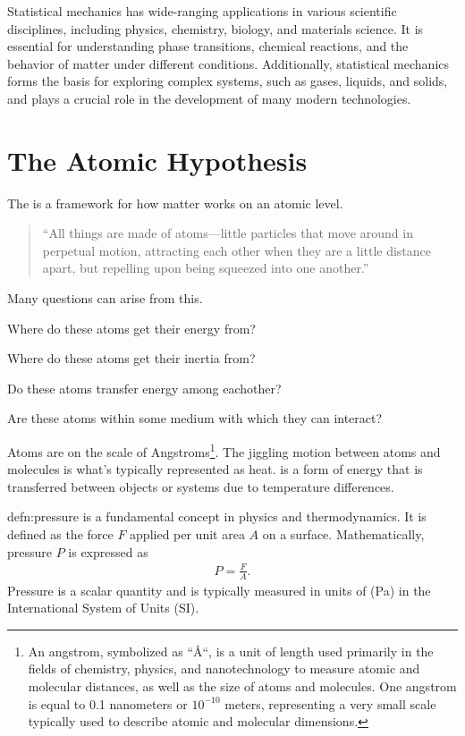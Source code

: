 Statistical mechanics has wide-ranging applications in various scientific disciplines, including physics, chemistry, biology, and materials science. It is essential for understanding phase transitions, chemical reactions, and the behavior of matter under different conditions. Additionally, statistical mechanics forms the basis for exploring complex systems, such as gases, liquids, and solids, and plays a crucial role in the development of many modern technologies.

\section{The Atomic Hypothesis}

The  is a framework for how matter works on an atomic level.

\begin{quotation}
	``All things are made of atoms—little particles that move around in perpetual motion, attracting each other when they are a little distance apart, but repelling upon being squeezed into one another.''
\end{quotation}

Many questions can arise from this.

\begin{questions}
	\item Where do these atoms get their energy from?
 	\item Where do these atoms get their inertia from?
  	\item Do these atoms transfer energy among eachother?
   	\item Are these atoms within some medium with which they can interact?
\end{questions}

Atoms are on the scale of Angstroms\footnote{An angstrom, symbolized as ``\AA``, is a unit of length used primarily in the fields of chemistry, physics, and nanotechnology to measure atomic and molecular distances, as well as the size of atoms and molecules. One angstrom is equal to 0.1 nanometers or $10^{-10}$ meters, representing a very small scale typically used to describe atomic and molecular dimensions.}. The jiggling motion between atoms and molecules is what's typically represented as heat.  is a form of energy that is transferred between objects or systems due to temperature differences.

\begin{defn}[Pressure]{defn:pressure}
	 is a fundamental concept in physics and thermodynamics. It is defined as the force $F$ applied per unit area $A$ on a surface. Mathematically, pressure $P$ is expressed as 
	\begin{align}
		P=\frac{F}{A}.
	\end{align}
	Pressure is a scalar quantity and is typically measured in units of  (Pa) in the International System of Units (SI). 
\end{defn}

